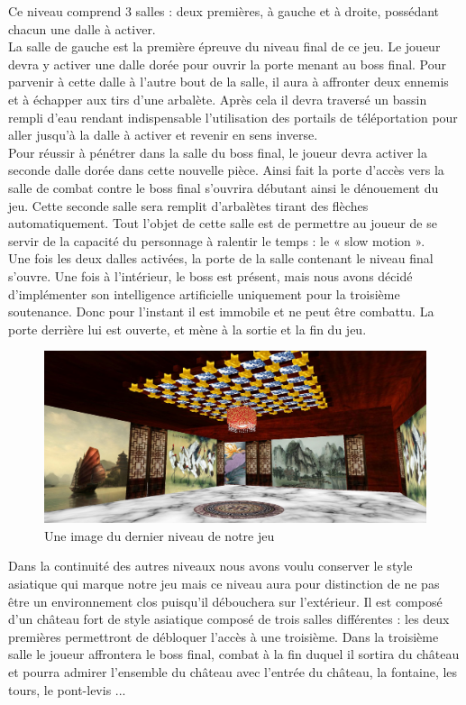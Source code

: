 \documentclass[12pt]{article}
\begin{document}
Ce niveau comprend 3 salles : deux premières, à gauche et à droite, possédant chacun une dalle à activer. \\
La salle de gauche est la première épreuve du niveau final de ce jeu. Le joueur devra y activer une dalle dorée pour ouvrir la porte menant au boss final. Pour parvenir à cette dalle à l'autre bout de la salle, il aura à affronter deux ennemis et à échapper aux tirs d'une arbalète. Après cela il devra traversé un bassin rempli d'eau rendant indispensable l'utilisation des portails de téléportation pour aller jusqu'à la dalle à activer et revenir en sens inverse.\\
Pour réussir à pénétrer dans la salle du boss final, le joueur devra activer la seconde dalle dorée dans cette nouvelle pièce. Ainsi fait la porte d'accès vers la salle de combat contre le boss final s'ouvrira débutant ainsi le dénouement du jeu. Cette seconde salle sera remplit d'arbalètes tirant des flèches automatiquement. Tout l'objet de cette salle est de permettre au joueur de se servir de la capacité du personnage à ralentir le temps : le « slow motion ».\\
Une fois les deux dalles activées, la porte de la salle contenant le niveau final s'ouvre. Une fois à l'intérieur, le boss est présent, mais nous avons décidé d'implémenter son intelligence artificielle uniquement pour la troisième soutenance. Donc pour l'instant il est immobile et ne peut être combattu. La porte derrière lui est ouverte, et mène à la sortie et la fin du jeu.

\begin{figure}[h]
\centering
\includegraphics[scale=0.4]{3.jpg}
\caption{Une image du dernier niveau de notre jeu}
\end{figure}

\newpage

Dans la continuité des autres niveaux nous avons voulu conserver le style asiatique qui marque notre jeu mais ce niveau aura pour distinction de ne pas être un environnement clos puisqu'il débouchera sur l'extérieur. Il est composé d'un château fort de style asiatique composé de trois salles différentes : les deux premières permettront de débloquer l'accès à une troisième. Dans la troisième salle le joueur affrontera le boss final, combat à la fin duquel il sortira du château et pourra admirer l'ensemble du château avec l'entrée du château, la fontaine, les tours, le pont-levis ...\\
\end{document}
